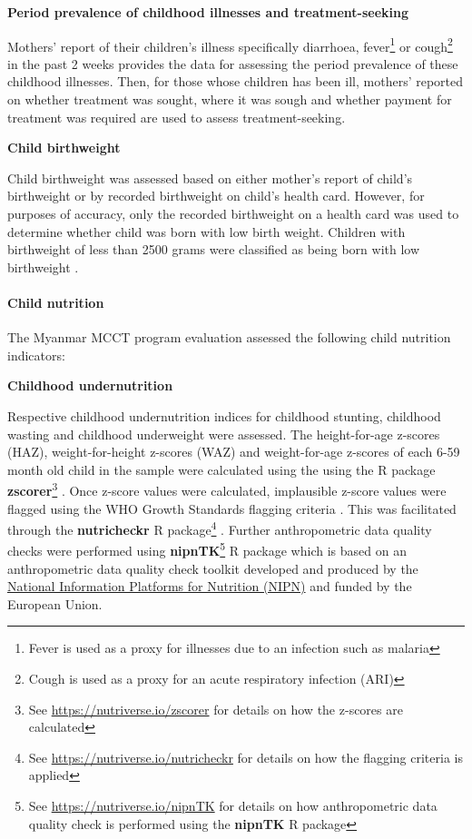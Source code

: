\documentclass[12pt,a4paper]{article}
\let\oldparagraph\paragraph
\renewcommand{\paragraph}[1]{\oldparagraph{#1}\mbox{}}
\let\rmarkdownfootnote\footnote%
\def\footnote{\protect\rmarkdownfootnote}
\begin{document}
\newpage

\textbf{Period prevalence of childhood illnesses and treatment-seeking}

Mothers' report of their children's illness specifically diarrhoea, fever\footnote{Fever is used as a proxy for illnesses due to an infection such as malaria} or cough\footnote{Cough is used as a proxy for an acute respiratory infection (ARI)} in the past 2 weeks provides the data for assessing the period prevalence of these childhood illnesses. Then, for those whose children has been ill, mothers' reported on whether treatment was sought, where it was sough and whether payment for treatment was required are used to assess treatment-seeking.

\textbf{Child birthweight}

Child birthweight was assessed based on either mother's report of child's birthweight or by recorded birthweight on child's health card. However, for purposes of accuracy, only the recorded birthweight on a health card was used to determine whether child was born with low birth weight. Children with birthweight of less than 2500 grams were classified as being born with low birthweight \citep{Woertman:1993hp, Kelly:1997wa}.

\hypertarget{cnut}{%
\paragraph{Child nutrition}\label{cnut}}

The Myanmar MCCT program evaluation assessed the following child nutrition indicators:

\textbf{Childhood undernutrition}

Respective childhood undernutrition indices for childhood stunting, childhood wasting and childhood underweight were assessed. The height-for-age z-scores (HAZ), weight-for-height z-scores (WAZ) and weight-for-age z-scores of each 6-59 month old child in the sample were calculated using the using the R package \textbf{zscorer}\footnote{See \url{https://nutriverse.io/zscorer} for details on how the z-scores are calculated} \citep{zscorer2019}. Once z-score values were calculated, implausible z-score values were flagged using the WHO Growth Standards flagging criteria \citep{WorldHealthOrganizationWHO2006}. This was facilitated through the \textbf{nutricheckr} R package\footnote{See \url{https://nutriverse.io/nutricheckr} for details on how the flagging criteria is applied} \citep{nutricheckr2019}. Further anthropometric data quality checks were performed using \textbf{nipnTK}\footnote{See \url{https://nutriverse.io/nipnTK} for details on how anthropometric data quality check is performed using the \textbf{nipnTK} R package} \citep{nipnTK2019} R package which is based on an anthropometric data quality check toolkit developed and produced by the \href{http://www.nipn-nutrition-platforms.org}{National Information Platforms for Nutrition (NIPN)} and funded by the European Union.
\end{document}
